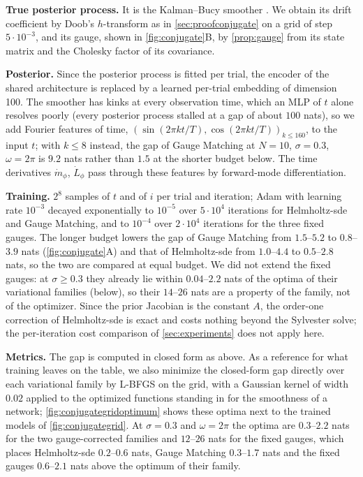 \documentclass{article} %
\begin{document}
\textbf{True posterior process.} It is the Kalman--Bucy smoother \citep{Särkkä_Solin_2019}. We obtain its drift coefficient by Doob's $h$-transform as in \cref{sec:proofconjugate} on a grid of step $5 \cdot 10^{-3}$, and its gauge, shown in \cref{fig:conjugate}B, by \cref{prop:gauge} from its state matrix and the Cholesky factor of its covariance.

\textbf{Posterior.} Since the posterior process is fitted per trial, the encoder of the shared architecture is replaced by a learned per-trial embedding of dimension 100. The smoother has kinks at every observation time, which an MLP of $t$ alone resolves poorly (every posterior process stalled at a gap of about $100$ nats), so we add Fourier features of time, $(\sin(2 \pi k t / T), \cos(2 \pi k t / T))_{k \le 160}$, to the input $t$; with $k \le 8$ instead, the gap of Gauge Matching at $N = 10$, $\sigma = 0.3$, $\omega = 2\pi$ is $9.2$ nats rather than $1.5$ at the shorter budget below. The time derivatives $\dot m_\phi$, $\dot L_\phi$ pass through these features by forward-mode differentiation.

\textbf{Training.} $2^8$ samples of $t$ and of $i$ per trial and iteration; Adam with learning rate $10^{-3}$ decayed exponentially to $10^{-5}$ over $5 \cdot 10^4$ iterations for Helmholtz-\gls{sde} and Gauge Matching, and to $10^{-4}$ over $2 \cdot 10^4$ iterations for the three fixed gauges. The longer budget lowers the gap of Gauge Matching from $1.5$--$5.2$ to $0.8$--$3.9$ nats (\cref{fig:conjugate}A) and that of Helmholtz-\gls{sde} from $1.0$--$4.4$ to $0.5$--$2.8$ nats, so the two are compared at equal budget. We did not extend the fixed gauges: at $\sigma \ge 0.3$ they already lie within $0.04$--$2.2$ nats of the optima of their variational families (below), so their $14$--$26$ nats are a property of the family, not of the optimizer. Since the prior Jacobian is the constant $A$, the order-one correction of Helmholtz-\gls{sde} is exact and costs nothing beyond the Sylvester solve; the per-iteration cost comparison of \cref{sec:experiments} does not apply here.

\textbf{Metrics.} The gap is computed in closed form as above. As a reference for what training leaves on the table, we also minimize the closed-form gap directly over each variational family by L-BFGS on the grid, with a Gaussian kernel of width $0.02$ applied to the optimized functions standing in for the smoothness of a network; \cref{fig:conjugategridoptimum} shows these optima next to the trained models of \cref{fig:conjugategrid}. At $\sigma = 0.3$ and $\omega = 2\pi$ the optima are $0.3$--$2.2$ nats for the two gauge-corrected families and $12$--$26$ nats for the fixed gauges, which places Helmholtz-\gls{sde} $0.2$--$0.6$ nats, Gauge Matching $0.3$--$1.7$ nats and the fixed gauges $0.6$--$2.1$ nats above the optimum of their family.
\end{document}
